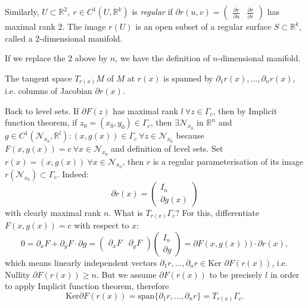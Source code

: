 \documentclass[a4paper]{article}
\theoremstyle{definition}
\newcommand{\Ker}{\text{Ker}}
\begin{document}
Similarly, $U\subset \mathbb R^2,\ r\in C^1(U,\mathbb R^k)$ is \textit{regular} if $\partial r(u,v)=\begin{pmatrix}
    \frac{\partial r}{\partial u} & \frac{\partial r}{\partial v}
\end{pmatrix}$ has maximal rank 2. The image $r(U)$ is an open subset of a regular surface $S\subset \mathbb R^k$, called a 2-dimensional manifold.

If we replace the 2 above by $n$, we have the definition of $n$-dimensional manifold.

The tangent space $T_{r(x)}M$ of $M$ at $r(x)$ is spanned by $\partial_1 r(x),\ldots,\partial_n r(x)$, i.e. columns of Jacobian $\partial r(x)$.

Back to level sets. If $\partial F(z)$ has maximal rank $l \ \forall z\in \Gamma_c$, then by Implicit function theorem, if $z_0=(x_0,y_0)\in \Gamma_c$, then $\exists \mathcal N_{x_0}$ in $\mathbb R^n$ and $g\in C^1(\mathcal N_{x_0},\mathbb R^l): (x,g(x)) \in \Gamma_c \ \forall z\in \mathcal N_{x_0}$ because $F(x,g(x)) =c \ \forall x\in \mathcal N_{x_0}$ and definition of level sets. Set $r(x)=(x,g(x)) \ \forall x\in \mathcal N_{x_0}$, then $r$ is a regular parameterisation of its image $r\left(\mathcal N_{x_0}\right) \subset \Gamma_c$. Indeed: 
\[
\partial r(x) = \begin{pmatrix}
    I_n \\ \partial g(x)
\end{pmatrix} 
\]
with clearly maximal rank $n$. What is $T_{r(x)} \Gamma_c$? For this, differentiate $F(x,g(x))=c$ with respect to $x$:
\[
0=\partial_x F+\partial_y F \cdot \partial g= \begin{pmatrix}
    \partial_x F & \partial_y F
\end{pmatrix} \begin{pmatrix}
    I_n  \\ \partial g
\end{pmatrix} = \partial F(x,g(x))) \cdot \partial r(x),
\]
which means linearly independent vectors $\partial_1 r,\ldots,\partial_n r \in \text{Ker } \partial F(r(x))$, i.e. Nullity $\partial F(r(x)) \geq n$. But we assume $\partial F(r(x))$ to be precisely $l$ in order to apply Implicit function theorem, therefore
\[
\Ker \partial F(r(x))=\text{span}\{\partial_1 r,\ldots,\partial_n r\} = T_{r(x)} \Gamma_c.
\]
\end{document}
